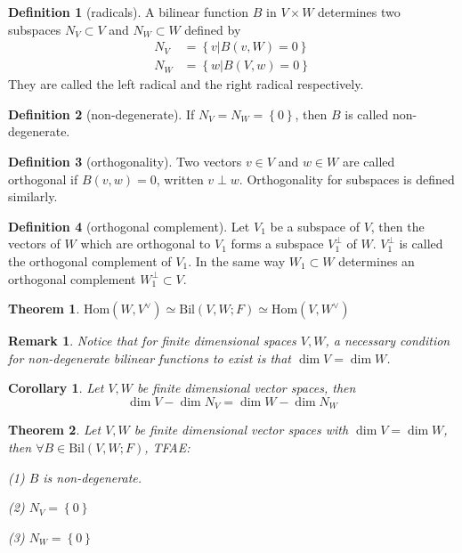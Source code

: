 \documentclass{book}
\newtheorem{theorem}{Theorem}[section]
\newtheorem{corollary}{Corollary}[theorem]
\newtheorem*{remark}{Remark}
\theoremstyle{definition}
\newtheorem{definition}{Definition}[section]
\begin{document}
\begin{definition}[radicals]
A bilinear function $B$ in $V\times W$ determines two subspaces $N_V\subset V$ and $N_W\subset W$ defined by 
\begin{align*}
N_V&=\left \{ v|B(v,W)=0 \right \} \\
N_W&=\left \{ w|B(V,w)=0 \right \} 
\end{align*}
They are called the left radical and the right radical respectively.
\end{definition}
\begin{definition}[non-degenerate]
If $N_V=N_W=\left \{ 0 \right \} $, then $B$ is called non-degenerate.
\end{definition}
\begin{definition}[orthogonality]
Two vectors $v\in V$ and $w\in W$ are called orthogonal if $B(v,w)=0$, written $v\perp w$. Orthogonality for subspaces is defined similarly.
\end{definition}
\begin{definition}[orthogonal complement]
Let $V_1$ be a subspace of $V$, then the vectors of $W$ which are orthogonal to $V_1$ forms a subspace $V_1^\perp$ of $W$. $V_1^\perp$ is called the orthogonal complement of $V_1$. In the same way $W_1\subset W$ determines an orthogonal complement $W_1^\perp\subset V$.
\end{definition}

\begin{theorem}
$\text{Hom}(W,V^\vee)\simeq \text{Bil}(V,W;F)\simeq \text{Hom}(V,W^\vee)$
\end{theorem}
\begin{remark}
Notice that for finite dimensional spaces $V,W$, a necessary condition for non-degenerate bilinear functions to exist is that $\dim V=\dim W$.
\end{remark}
\begin{corollary}
Let $V,W$ be finite dimensional vector spaces, then \[\dim V-\dim N_V=\dim W-\dim N_W\]
\end{corollary}
\begin{theorem}
Let $V,W$ be finite dimensional vector spaces with $\dim V=\dim W$, then $\forall B\in \text{Bil}(V,W;F)$, TFAE:\par
(1) $B$ is non-degenerate.\par
(2) $N_V=\left\{0\right\}$\par
(3) $N_W=\left\{0\right\}$
\end{theorem}
\end{document}
